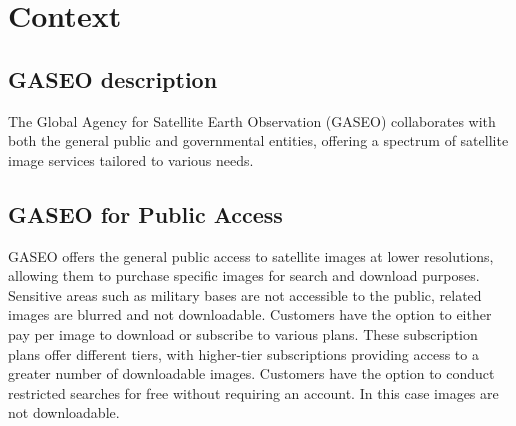 \documentclass[12pt]{article}
\begin{document}



\newpage
{}


\section{Context} \label{Sec: Context}



\subsection{GASEO description}
The Global Agency for Satellite Earth Observation (GASEO) collaborates with both the general public and governmental entities, offering a spectrum of satellite image services tailored to various needs.

\subsection{GASEO for Public Access}
GASEO offers the general public access to satellite images at lower resolutions, allowing them to purchase specific images for search and download purposes.
Sensitive areas such as military bases are not accessible to the public, related images are blurred and not downloadable. 
Customers have the option to either pay per image to download or subscribe to various plans.
These subscription plans offer different tiers, with higher-tier subscriptions providing access to a greater number of downloadable images. 
Customers have the option to conduct restricted searches for free without requiring an account. In this case images are not downloadable.
\end{document}
